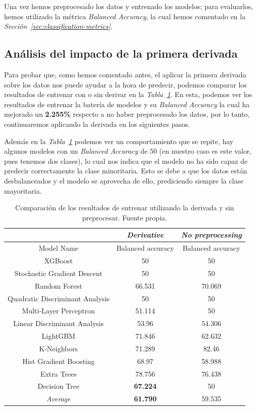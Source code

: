 Una vez hemos preprocesado los datos y entrenado los modelos; para evaluarlos, hemos utilizado la métrica \textit{Balanced Accuracy}, la cual hemos comentado en la \textit{Sección\ \ref{sec:classification-metrics}}.


\subsection{Análisis del impacto de la primera derivada}

Para probar que, como hemos comentado antes, el aplicar la primera derivada sobre los datos nos puede ayudar a la hora de predecir, podemos comparar los resultados de entrenar con o sin derivar en la \textit{Tabla\ \ref{tab:nopreprocessing-derivative-results}}. En esta, podemos ver los resultados de entrenar la batería de modelos y su \textit{Balanced Accuracy} la cual ha mejorado un \textbf{2.255\%} respecto a no haber preprocesado los datos, por lo tanto, continuaremos aplicando la derivada en los siguientes pasos.

Además en la \textit{Tabla\ \ref{tab:nopreprocessing-derivative-results}} podemos ver un comportamiento que se repite, hay algunos modelos con un \textit{Balanced Accuracy} de $50$ (en nuestro caso es este valor, pues tenemos dos clases), lo cual nos indica que el modelo no ha sido capaz de predecir correctamente la clase minoritaria. Esto se debe a que los datos están desbalanceados y el modelo se aprovecha de ello, prediciendo siempre la clase mayoritaria.


\begin{table}[!ht]
    \centering
    \begin{tabular}{|c|c|c|}
        \hline
        & \textit{Derivative} & \textit{No preprocessing} \\ \hline
        Model Name & Balanced accuracy & Balanced accuracy \\ \hline
        XGBoost & 50 & 50 \\ 
        Stochastic Gradient Descent & 50 & 50 \\ 
        Random Forest & 66.531 & 70.069 \\ 
        Quadratic Discriminant Analysis & 50 & 50 \\ 
        Multi-Layer Perceptron & 51.114 & 50 \\ 
        Linear Discriminant Analysis & 53.96 & 54.306 \\ 
        LightGBM & 71.846 & 62.632 \\ 
        K-Neighbors & 71.289 & 82.46 \\ 
        Hist Gradient Boosting & 68.97 & 58.988 \\ 
        Extra Trees & 78.756 & 76.438 \\ 
        Decision Tree & \textbf{67.224} & 50 \\ \hline
        \textit{Average} & \textbf{61.790} & 59.535 \\ \hline
    \end{tabular}
    \caption{Comparación de los resultados de entrenar utilizando la derivada y sin preprocesar. Fuente propia.}\ \label{tab:nopreprocessing-derivative-results}
\end{table}

